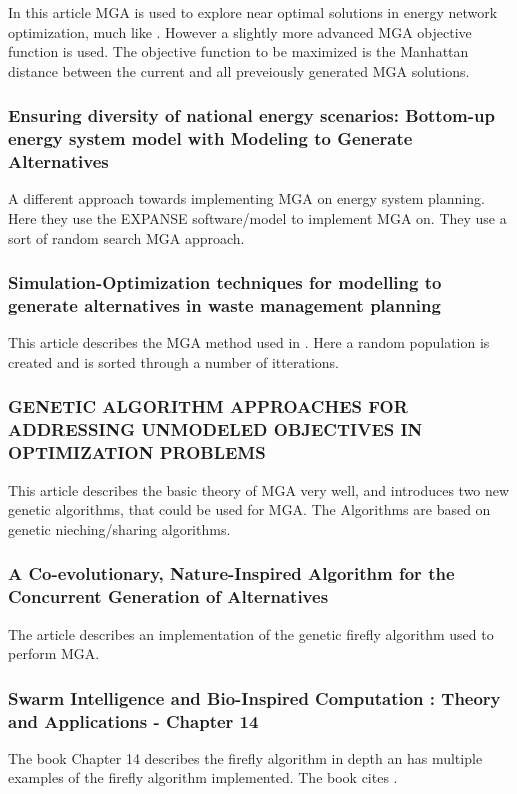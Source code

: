In this article MGA is used to explore near optimal solutions in energy network optimization, much like \cite{DeCarolis_MGA}. However a slightly more advanced MGA objective function is used. The objective function to be maximized is the Manhattan distance between the current and all preveiously generated MGA solutions. 

\subsubsection{Ensuring diversity of national energy scenarios: Bottom-up energy
system model with Modeling to Generate Alternatives \cite{BERNTSEN2017886}}
A different approach towards implementing MGA on energy system planning. Here they use the  EXPANSE software/model to implement MGA on. They use a sort of random search MGA approach.

\subsubsection{Simulation-Optimization techniques for
modelling to generate alternatives in waste
management planning\cite{Yavuz2011}}
This article describes the MGA method used in \cite{BERNTSEN2017886}. Here a random population is created and is sorted through a number of itterations. 

\subsubsection{GENETIC ALGORITHM APPROACHES FOR ADDRESSING UNMODELED OBJECTIVES IN OPTIMIZATION PROBLEMS \cite{Genetic_Algorithms_for_MGA}}
This article describes the basic theory of MGA very well, and introduces two new genetic algorithms, that could be used for MGA. The Algorithms are based on genetic nieching/sharing algorithms. 

\subsubsection{A Co-evolutionary, Nature-Inspired Algorithm for the Concurrent Generation of Alternatives \cite{FireFly_MGA_Article}}

The article \cite{FireFly_MGA_Article} describes an implementation of the genetic firefly algorithm used to perform MGA. 

\subsubsection{Swarm Intelligence and Bio-Inspired Computation : Theory and Applications - Chapter 14 \cite{Bio_computation_book}}

The book \cite{Bio_computation_book} Chapter 14 describes the firefly algorithm in depth an has multiple examples of the firefly algorithm implemented. The book cites \cite{FireFly_MGA_Article} . 

